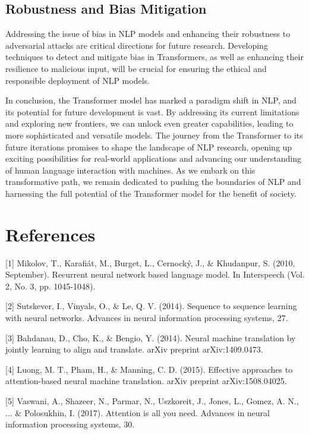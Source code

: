 \documentclass{article}
\begin{document}
\subsection{Robustness and Bias Mitigation}

Addressing the issue of bias in NLP models and enhancing their robustness to adversarial attacks are critical directions for future research. Developing techniques to detect and mitigate bias in Transformers, as well as enhancing their resilience to malicious input, will be crucial for ensuring the ethical and responsible deployment of NLP models.


In conclusion, the Transformer model has marked a paradigm shift in NLP, and its potential for future development is vast. By addressing its current limitations and exploring new frontiers, we can unlock even greater capabilities, leading to more sophisticated and versatile models. The journey from the Transformer to its future iterations promises to shape the landscape of NLP research, opening up exciting possibilities for real-world applications and advancing our understanding of human language interaction with machines. As we embark on this transformative path, we remain dedicated to pushing the boundaries of NLP and harnessing the full potential of the Transformer model for the benefit of society.


\section*{References}


{
\small


[1] Mikolov, T., Karafiát, M., Burget, L., Cernocký, J., \& Khudanpur, S. (2010, September). Recurrent neural network based language model. In Interspeech (Vol. 2, No. 3, pp. 1045-1048).

[2] Sutskever, I., Vinyals, O., \& Le, Q. V. (2014). Sequence to sequence learning with neural networks. Advances in neural information processing systems, 27.


[3] Bahdanau, D., Cho, K., \& Bengio, Y. (2014). Neural machine translation by jointly learning to align and translate. arXiv preprint arXiv:1409.0473.

[4] Luong, M. T., Pham, H., \& Manning, C. D. (2015). Effective approaches to attention-based neural machine translation. arXiv preprint arXiv:1508.04025.

[5] Vaswani, A., Shazeer, N., Parmar, N., Uszkoreit, J., Jones, L., Gomez, A. N., ... \& Polosukhin, I. (2017). Attention is all you need. Advances in neural information processing systems, 30.

}
\end{document}
